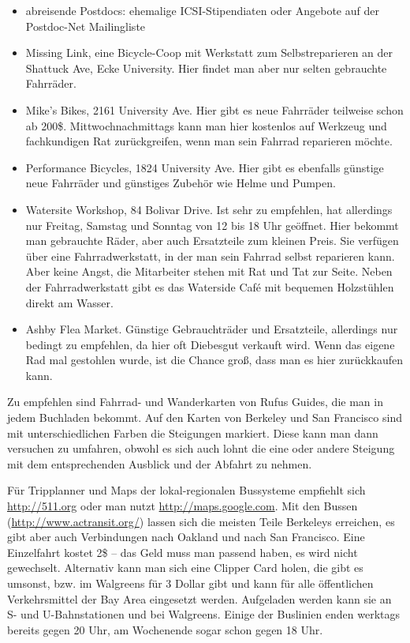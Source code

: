 \documentclass[a4paper]{scrreprt}
\begin{document}
\begin{itemize}

\item abreisende Postdocs: ehemalige ICSI-Stipendiaten oder Angebote auf der Postdoc-Net Mailingliste

\item Missing Link, eine Bicycle-Coop mit Werkstatt zum Selbstreparieren an der Shattuck Ave, Ecke University. Hier findet man aber nur selten gebrauchte Fahrräder.

\item Mike's Bikes, 2161 University Ave. Hier gibt es neue Fahrräder teilweise schon ab 200\$. Mittwochnachmittags kann man hier kostenlos auf Werkzeug und fachkundigen Rat zurückgreifen, wenn man sein Fahrrad reparieren möchte.

\item Performance Bicycles, 1824 University Ave. Hier gibt es ebenfalls günstige neue Fahrräder und günstiges Zubehör wie Helme und Pumpen. 

\item Watersite Workshop, 84 Bolivar Drive. Ist sehr zu empfehlen, hat allerdings nur Freitag, Samstag und Sonntag von 12 bis 18 Uhr geöffnet. Hier bekommt man gebrauchte Räder, aber auch Ersatzteile   zum kleinen Preis. Sie verfügen über eine Fahrradwerkstatt, in der man sein Fahrrad selbst reparieren kann. Aber keine Angst, die Mitarbeiter stehen mit Rat und Tat zur Seite. Neben der Fahrradwerkstatt gibt es das Waterside Café mit bequemen Holzstühlen direkt am Wasser. 

\item Ashby Flea Market. Günstige Gebrauchträder und Ersatzteile, allerdings nur bedingt zu empfehlen, da hier oft Diebesgut verkauft wird. Wenn das eigene Rad mal gestohlen wurde, ist die Chance groß, dass man es hier zurückkaufen kann.

\end{itemize}

Zu empfehlen sind Fahrrad- und Wanderkarten von Rufus Guides, die man in jedem Buchladen bekommt. 
Auf den Karten von Berkeley und San Francisco sind mit unterschiedlichen Farben die Steigungen markiert. 
Diese kann man dann versuchen zu umfahren, obwohl es sich auch lohnt die eine oder andere Steigung mit dem entsprechenden Ausblick und der Abfahrt zu nehmen. 

Für Tripplanner und Maps der lokal-regionalen Bussysteme empfiehlt sich \url{http://511.org} oder man nutzt \url{http://maps.google.com}. 
Mit den Bussen (\url{http://www.actransit.org/}) lassen sich die meisten Teile Berkeleys erreichen, es gibt aber auch Verbindungen nach Oakland und nach San Francisco. 
Eine Einzelfahrt kostet 2\$ -- das Geld muss man passend haben, es wird nicht gewechselt. 
Alternativ kann man sich eine Clipper Card holen, die gibt es umsonst, bzw. im Walgreens f\"ur 3 Dollar gibt und kann für alle öffentlichen Verkehrsmittel der Bay Area eingesetzt werden. 
Aufgeladen werden kann sie an S- und U-Bahnstationen und bei Walgreens. 
Einige der Buslinien enden werktags bereits gegen 20 Uhr, am Wochenende sogar schon gegen 18 Uhr. 
\end{document}
